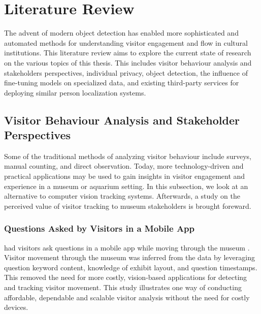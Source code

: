 \section{Literature Review}
\label{sec:literature}
The advent of modern object detection has enabled more sophisticated and automated methods for understanding visitor engagement and flow in cultural institutions. This literature review aims to explore the current state of research on the various topics of this thesis. This includes visitor behaviour analysis and stakeholders perspectives, individual privacy, object detection, the influence of fine-tuning models on specialized data, and existing third-party services for deploying similar person localization systems.

\subsection{Visitor Behaviour Analysis and Stakeholder Perspectives}
\label{sec:visitor_behaviuor_analysis}
Some of the traditional methods of analyzing visitor behaviour include surveys, manual counting, and direct observation. Today, more technology-driven and practical applications may be used to gain insights in visitor engagement and experience in a museum or aquarium setting. In this subsection, we look at an alternative to computer vision tracking systems. Afterwards, a study on the perceived value of visitor tracking to museum stakeholders is brought foreward.

\subsubsection{Questions Asked by Visitors in a Mobile App}
\citeauthor{co2023appquestionairre} had visitors ask questions in a mobile app while moving through the museum \citeyear{co2023appquestionairre}. Visitor movement through the museum was inferred from the data by leveraging question keyword content, knowledge of exhibit layout, and question timestamps. This removed the need for more costly, vision-based applications for detecting and tracking visitor movement. This study illustrates one way of conducting affordable, dependable and scalable visitor analysis without the need for costly devices.


